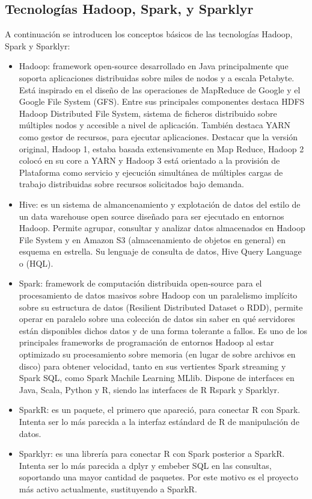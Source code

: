 \documentclass[
]{book}
\begin{document}
\subsection{Tecnologías Hadoop, Spark, y Sparklyr}\label{tecnologuxedas-hadoop-spark-y-sparklyr}

A continuación se introducen los conceptos básicos de las tecnologías Hadoop, Spark y Sparklyr:

\begin{itemize}
\item
  Hadoop: framework open-source desarrollado en Java principalmente que soporta aplicaciones distribuidas sobre miles de nodos y a escala Petabyte. Está inspirado en el diseño de las operaciones de MapReduce de Google y el Google File System (GFS). Entre sus principales componentes destaca HDFS Hadoop Distributed File System, sistema de ficheros distribuido sobre múltiples nodos y accesible a nivel de aplicación. También destaca YARN como gestor de recursos, para ejecutar aplicaciones. Destacar que la versión original, Hadoop 1, estaba basada extensivamente en Map Reduce, Hadoop 2 colocó en su core a YARN y Hadoop 3 está orientado a la provisión de Plataforma como servicio y ejecución simultánea de múltiples cargas de trabajo distribuidas sobre recursos solicitados bajo demanda.
\item
  Hive: es un sistema de almancenamiento y explotación de datos del estilo de un data warehouse open source diseñado para ser ejecutado en entornos Hadoop. Permite agrupar, consultar y analizar datos almacenados en Hadoop File System y en Amazon S3 (almacenamiento de objetos en general) en esquema en estrella. Su lenguaje de consulta de datos, Hive Query Language o (HQL).
\item
  Spark: framework de computación distribuida open-source para el procesamiento de datos masivos sobre Hadoop con un paralelismo implícito sobre su estructura de datos (Resilient Distributed Dataset o RDD), permite operar en paralelo sobre una colección de datos sin saber en qué servidores están disponibles dichos datos y de una forma tolerante a fallos. Es uno de los principales frameworks de programación de entornos Hadoop al estar optimizado su procesamiento sobre memoria (en lugar de sobre archivos en disco) para obtener velocidad, tanto en sus vertientes Spark streaming y Spark SQL, como Spark Machile Learning MLlib. Dispone de interfaces en Java, Scala, Python y R, siendo las interfaces de R Rspark y Sparklyr.
\item
  SparkR: es un paquete, el primero que apareció, para conectar R con Spark. Intenta ser lo más parecida a la interfaz estándard de R de manipulación de datos.
\item
  Sparklyr: es una librería para conectar R con Spark posterior a SparkR. Intenta ser lo más parecida a dplyr y embeber SQL en las consultas, soportando una mayor cantidad de paquetes. Por este motivo es el proyecto más activo actualmente, sustituyendo a SparkR.
\end{itemize}
\end{document}
